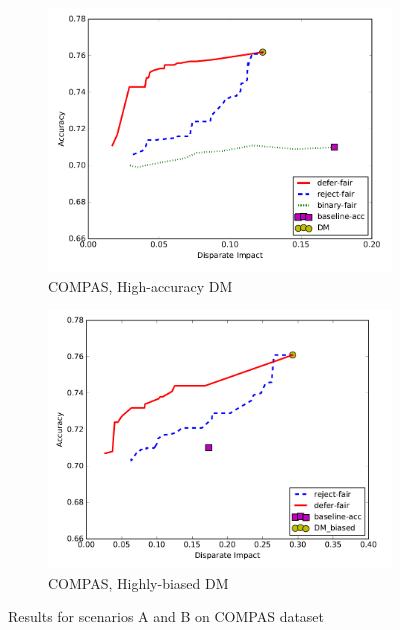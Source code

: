 \documentclass[11pt,a4paper,final]{article}
\begin{document}
\begin{figure}[ht]
\centering
\begin{subfigure}[t]{0.5\textwidth}
\includegraphics[width=\textwidth]{Figures/compasHighAcc.PNG}
\caption{COMPAS, High-accuracy DM}
\label{fig:pr-resHighAcc}
\end{subfigure}%
\begin{subfigure}[t]{0.5\textwidth}
\includegraphics[width=\textwidth]{Figures/compasHighlyBiased.PNG}
\caption{COMPAS, Highly-biased DM}
\label{fig:pr-resHighBias}
\end{subfigure}
\caption{Results for scenarios A and B on COMPAS dataset}
\label{fig:pr-resAB}
\end{figure}
\end{document}
